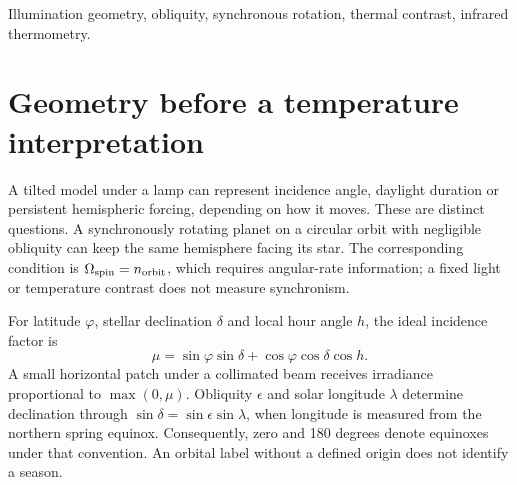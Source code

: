 \begin{abstract}
Illumination geometry determines where energy arrives; thermal exchange determines how a body responds. These stages require different observables. Twelve fixed-distance, labelled detector observations test a seasonal geometry but show large positional changes even at zero tilt and no northern--southern exchange. The corresponding continuous plateaus reveal fluctuations much smaller than those changes. A separate fixed-illumination example gives a day-to-night illuminance ratio of 450 and baseline-corrected thermal contrasts of 19.41~K for the infrared object-temperature indication and 11.48~K for barometer die temperature. A common framework connects incidence angle, rotation and two-region energy balance while retaining the distinction between optical response, absorbed power and temperature. The examples show which symmetry tests constrain the forcing and which additional measurements are needed to identify thermal redistribution.
\end{abstract}
\begin{IEEEkeywords}
Illumination geometry, obliquity, synchronous rotation, thermal contrast, infrared thermometry.
\end{IEEEkeywords}

\section{Geometry before a temperature interpretation}
A tilted model under a lamp can represent incidence angle, daylight duration or persistent hemispheric forcing, depending on how it moves. These are distinct questions. A synchronously rotating planet on a circular orbit with negligible obliquity can keep the same hemisphere facing its star. The corresponding condition is $\Omega_{\rm spin}=n_{\rm orbit}$, which requires angular-rate information; a fixed light or temperature contrast does not measure synchronism.

For latitude $\varphi$, stellar declination $\delta$ and local hour angle $h$, the ideal incidence factor is
\begin{equation}
 \mu=\sin\varphi\sin\delta+\cos\varphi\cos\delta\cos h.
 \label{eq:tidal-locking-incidence}
\end{equation}
A small horizontal patch under a collimated beam receives irradiance proportional to $\max(0,\mu)$. Obliquity $\epsilon$ and solar longitude $\lambda$ determine declination through $\sin\delta=\sin\epsilon\sin\lambda$, when longitude is measured from the northern spring equinox. Consequently, zero and 180 degrees denote equinoxes under that convention. An orbital label without a defined origin does not identify a season.

